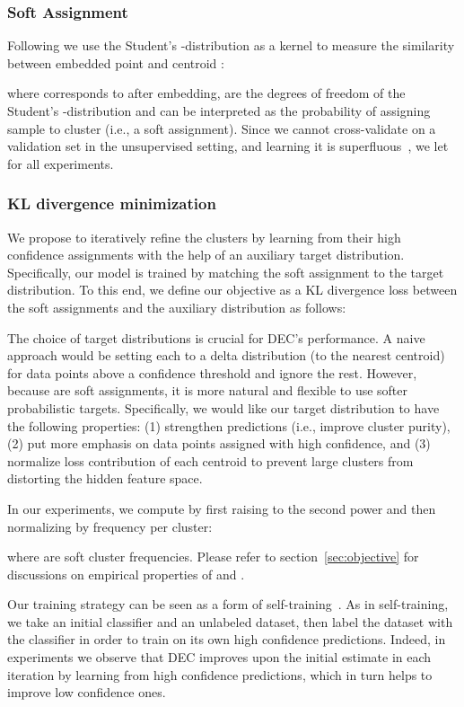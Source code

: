 \documentclass{article}
\begin{document}
\subsubsection{Soft Assignment}
Following \citet{van2008visualizing} we use the Student's -distribution as a kernel to measure the similarity between embedded point  and centroid :

where  corresponds to  after embedding,   are the degrees of freedom of the Student's -distribution and  can be interpreted as the probability of assigning sample  to cluster  (i.e., a soft assignment). Since we cannot cross-validate  on a validation set in the unsupervised setting, and learning it is superfluous~\citep{maaten2009learning}, we let  for all experiments.

\subsubsection{KL divergence minimization}
We propose to iteratively refine the clusters by learning from their high confidence assignments with the help of an auxiliary target distribution. 
Specifically, our model is trained by matching the soft assignment to the target distribution.
To this end, we define our objective as a KL divergence loss between the soft assignments  and the auxiliary distribution  as follows:

The choice of target distributions  is crucial for DEC's performance. A naive
approach would be setting each  to a delta distribution (to the nearest
centroid) for data points above a confidence threshold and ignore the rest.
However, because  are soft assignments, it is more natural and flexible to
use softer probabilistic targets. Specifically, we would like our target distribution to
have the following properties: (1) strengthen predictions (i.e., improve cluster
purity), (2) put more emphasis on data points assigned with high confidence, and
(3) normalize loss contribution of each centroid to prevent large clusters from distorting the hidden feature space.

In our experiments, we compute  by first raising  to the second power and then normalizing by frequency per cluster:

where  are soft cluster frequencies. Please refer to section~\ref{sec:objective} for discussions on empirical properties of  and .

Our training strategy can be seen as a form of self-training~\cite{nigam2000analyzing}. As in self-training, we take an initial classifier and an unlabeled dataset, then label the dataset with the classifier in order to train on its own high confidence predictions. Indeed, in experiments we observe that DEC improves upon the initial estimate in each iteration by learning from high confidence predictions, which in turn helps to improve low confidence ones.
\end{document}
